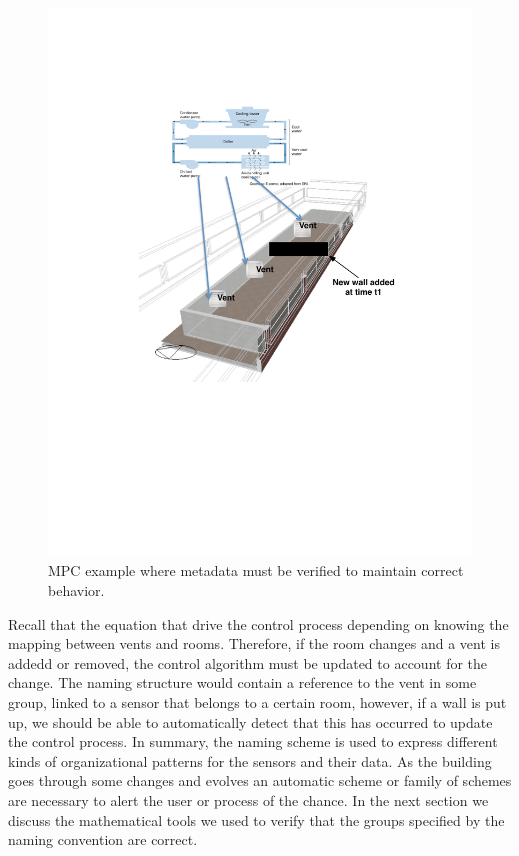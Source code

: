 \begin{figure}[h!] %
\centering
\includegraphics[width=0.5\columnwidth]{figs/mpc_example}
\caption{MPC example where metadata must be verified to maintain correct behavior.}
\label{fig:mpc_example2}
\end{figure}

Recall that the equation that drive the control process depending on knowing the mapping between vents and rooms.  Therefore,
if the room changes and a vent is addedd or removed, the control algorithm must be updated to account for the change.  The naming
structure would contain a reference to the vent in some group, linked to a sensor that belongs to a certain room, however,
if a wall is put up, we should be able to automatically detect that this has occurred to update the control process.
In summary, the naming scheme is used to express different kinds of organizational patterns for the sensors and their data.
As the building goes through some changes and evolves an automatic scheme or family of schemes are necessary to alert
the user or process of the chance.  In the next
section we discuss the mathematical tools we used to verify that the groups specified by the naming convention are correct.

